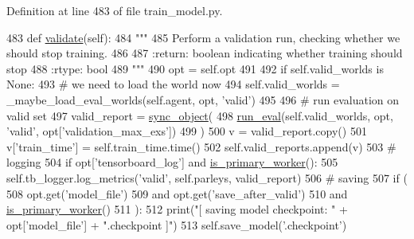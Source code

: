 Definition at line 483 of file train\+\_\+model.\+py.


\begin{DoxyCode}
483     \textcolor{keyword}{def }\hyperlink{namespaceparlai_1_1core_1_1worlds_afc3fad603b7bce41dbdc9cdc04a9c794}{validate}(self):
484         \textcolor{stringliteral}{"""}
485 \textcolor{stringliteral}{        Perform a validation run, checking whether we should stop training.}
486 \textcolor{stringliteral}{}
487 \textcolor{stringliteral}{        :return: boolean indicating whether training should stop}
488 \textcolor{stringliteral}{        :rtype: bool}
489 \textcolor{stringliteral}{        """}
490         opt = self.opt
491 
492         \textcolor{keywordflow}{if} self.valid\_worlds \textcolor{keywordflow}{is} \textcolor{keywordtype}{None}:
493             \textcolor{comment}{# we need to load the world now}
494             self.valid\_worlds = \_maybe\_load\_eval\_worlds(self.agent, opt, \textcolor{stringliteral}{'valid'})
495 
496         \textcolor{comment}{# run evaluation on valid set}
497         valid\_report = \hyperlink{namespaceparlai_1_1utils_1_1distributed_a269d3c7284127d9b287b9b61e9161de6}{sync\_object}(
498             \hyperlink{namespaceparlai_1_1scripts_1_1train__model_a496dfe3bf04da9b55d261b4c8d6229a7}{run\_eval}(self.valid\_worlds, opt, \textcolor{stringliteral}{'valid'}, opt[\textcolor{stringliteral}{'validation\_max\_exs'}])
499         )
500         v = valid\_report.copy()
501         v[\textcolor{stringliteral}{'train\_time'}] = self.train\_time.time()
502         self.valid\_reports.append(v)
503         \textcolor{comment}{# logging}
504         \textcolor{keywordflow}{if} opt[\textcolor{stringliteral}{'tensorboard\_log'}] \textcolor{keywordflow}{and} \hyperlink{namespaceparlai_1_1utils_1_1distributed_a9bb1dac198180590ef8c6b6c6f9fc2c4}{is\_primary\_worker}():
505             self.tb\_logger.log\_metrics(\textcolor{stringliteral}{'valid'}, self.parleys, valid\_report)
506         \textcolor{comment}{# saving}
507         \textcolor{keywordflow}{if} (
508             opt.get(\textcolor{stringliteral}{'model\_file'})
509             \textcolor{keywordflow}{and} opt.get(\textcolor{stringliteral}{'save\_after\_valid'})
510             \textcolor{keywordflow}{and} \hyperlink{namespaceparlai_1_1utils_1_1distributed_a9bb1dac198180590ef8c6b6c6f9fc2c4}{is\_primary\_worker}()
511         ):
512             print(\textcolor{stringliteral}{"[ saving model checkpoint: "} + opt[\textcolor{stringliteral}{'model\_file'}] + \textcolor{stringliteral}{".checkpoint ]"})
513             self.save\_model(\textcolor{stringliteral}{'.checkpoint'})

\end{DoxyCode}
